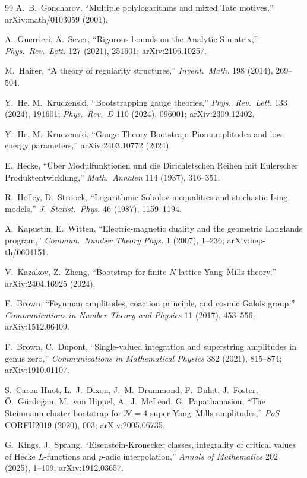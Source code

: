 \documentclass[11pt]{amsart}
\theoremstyle{definition}
\theoremstyle{remark}
\begin{document}
\begin{thebibliography}{99}
 A.~B.~Goncharov, ``Multiple polylogarithms
and mixed Tate motives,'' arXiv:math/0103059 (2001).

 A.~Guerrieri, A.~Sever, ``Rigorous bounds on
the Analytic S-matrix,'' \emph{Phys.\ Rev.\ Lett.} 127 (2021),
251601; arXiv:2106.10257.

 M.~Hairer, ``A theory of regularity
structures,'' \emph{Invent.\ Math.} 198 (2014), 269--504.

 Y.~He, M.~Kruczenski, ``Bootstrapping
gauge theories,'' \emph{Phys.\ Rev.\ Lett.} 133 (2024), 191601;
\emph{Phys.\ Rev.\ D} 110 (2024), 096001; arXiv:2309.12402.

 Y.~He, M.~Kruczenski, ``Gauge Theory
Bootstrap: Pion amplitudes and low energy parameters,''
arXiv:2403.10772 (2024).

 E.~Hecke, ``\"Uber Modulfunktionen und die
Dirichletschen Reihen mit Eulerscher Produktentwicklung,''
\emph{Math.\ Annalen} 114 (1937), 316--351.

 R.~Holley, D.~Stroock, ``Logarithmic
Sobolev inequalities and stochastic Ising models,''
\emph{J.\ Statist.\ Phys.} 46 (1987), 1159--1194.

 A.~Kapustin, E.~Witten, ``Electric-magnetic
duality and the geometric Langlands program,''
\emph{Commun.\ Number Theory Phys.} 1 (2007), 1--236;
arXiv:hep-th/0604151.

 V.~Kazakov, Z.~Zheng, ``Bootstrap for
finite $N$ lattice Yang--Mills theory,'' arXiv:2404.16925 (2024).

 F.~Brown, ``Feynman amplitudes,
coaction principle, and cosmic Galois group,'' \emph{Communications
in Number Theory and Physics} 11 (2017), 453--556; arXiv:1512.06409.

 F.~Brown, C.~Dupont, ``Single-valued
integration and superstring amplitudes in genus zero,''
\emph{Communications in Mathematical Physics} 382 (2021), 815--874;
arXiv:1910.01107.

 S.~Caron-Huot, L.~J.~Dixon,
J.~M.~Drummond, F.~Dulat, J.~Foster, \"O.~G\"urdo\u{g}an, M.~von
Hippel, A.~J.~McLeod, G.~Papathanasiou, ``The Steinmann cluster
bootstrap for $\mathcal{N}=4$ super Yang--Mills amplitudes,''
\emph{PoS} CORFU2019 (2020), 003; arXiv:2005.06735.

 G.~Kings, J.~Sprang, ``Eisenstein-Kronecker
classes, integrality of critical values of Hecke $L$-functions
and $p$-adic interpolation,'' \emph{Annals of Mathematics} 202
(2025), 1--109; arXiv:1912.03657.


\end{thebibliography}
\end{document}
